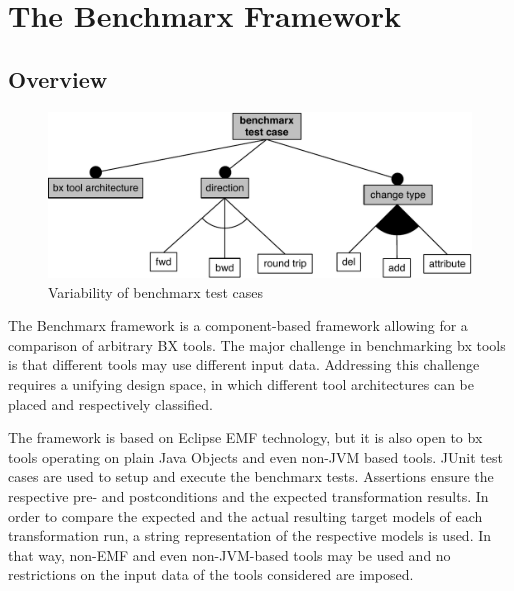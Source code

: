 \section{The Benchmarx Framework}
\label{sec:Benchmarx}

%
\subsection{Overview}

\begin{figure}[tb!]
	\centering
	\includegraphics[width=\columnwidth]{diagrams/framework/feature-model-benchmarx-test-case}
	\caption{Variability of benchmarx test cases}
	\label{fig:featureModelBenchmarxTestCase}
\end{figure}

The Benchmarx framework is a component-based framework allowing for a comparison of arbitrary BX tools. The major challenge in benchmarking bx tools is that different tools may use different input data. Addressing this challenge requires a unifying design space, in which different tool architectures can be placed and respectively classified. 

The framework is based on Eclipse EMF technology, but it is also open to bx tools operating on plain Java Objects and even non-JVM based tools. JUnit test cases are used to setup and execute the benchmarx tests. Assertions ensure the respective pre- and postconditions and the expected transformation results. In order to compare the expected and the actual resulting target models of each transformation run, a string representation of the respective models is used. In that way, non-EMF and even non-JVM-based tools may be used and no restrictions on the input data of the tools considered are imposed. 

